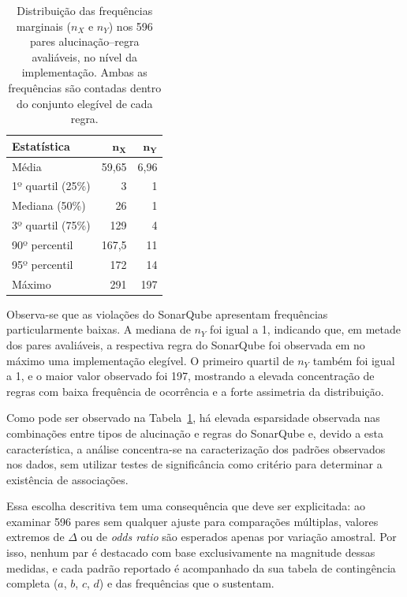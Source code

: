 \begin{table}[ht]
    \centering
    \caption{Distribuição das frequências marginais ($n_X$ e $n_Y$) nos 596 pares
    alucinação--regra avaliáveis, no nível da implementação. Ambas as
    frequências são contadas dentro do conjunto elegível de cada regra.}
    \label{tab:distribuicao_frequencias_marginais}
    
    \begin{tabular}{lrr}
        \hline
        \textbf{Estatística} 
        & $\boldsymbol{n_X}$ 
        & $\boldsymbol{n_Y}$ \\
        \hline
        
        Média              & 59,65  & 6,96 \\
        1º quartil (25\%)  & 3      & 1    \\
        Mediana (50\%)     & 26     & 1    \\
        3º quartil (75\%)  & 129    & 4    \\
        90º percentil      & 167,5  & 11   \\
        95º percentil      & 172    & 14   \\
        Máximo             & 291    & 197  \\
        
        \hline
    \end{tabular}
\end{table}

Observa-se que as violações do SonarQube apresentam frequências
particularmente baixas. A mediana de $n_Y$ foi igual a 1, indicando
que, em metade dos pares avaliáveis, a respectiva regra do SonarQube
foi observada em no máximo uma implementação elegível. O primeiro
quartil de $n_Y$ também foi igual a 1, e o maior valor observado foi
197, mostrando a elevada concentração de regras com baixa frequência de
ocorrência e a forte assimetria da distribuição.

Como pode ser observado na Tabela~\ref{tab:distribuicao_frequencias_marginais}, há elevada esparsidade observada nas combinações entre tipos de alucinação e regras do SonarQube e, devido a esta característica, a análise concentra-se na caracterização dos padrões observados nos dados, sem utilizar testes de significância como critério para determinar a existência de associações.

Essa escolha descritiva tem uma consequência que deve ser explicitada: ao examinar 596 pares sem qualquer ajuste para comparações múltiplas, valores extremos de $\Delta$ ou de \textit{odds ratio} são esperados apenas por variação amostral. Por isso, nenhum par é destacado com base exclusivamente na magnitude dessas medidas, e cada padrão reportado é acompanhado da sua tabela de contingência completa ($a$, $b$, $c$, $d$) e das frequências que o sustentam.

